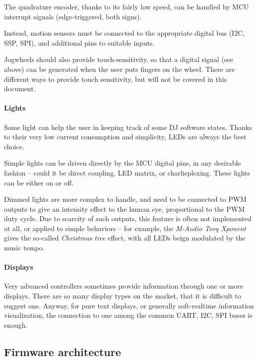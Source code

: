 \documentclass[a4paper,10pt]{article}
\begin{document}
\begin{multicols}{2}
The quadrature encoder, thanks to its fairly low speed, can be handled by
MCU interrupt signals (edge-triggered, both signs).

Instead, motion sensors must be connected to the appropriate digital bus
(I2C, SSP, SPI), and additional pins to suitable inputs.

Jogwheels should also provide touch-sensitivity, so that a digital signal
(see above) can be generated when the user puts fingers on the wheel.
There are different ways to provide touch sensitivity, but will not be
covered in this document.


\paragraph{Lights}
Some light can help the user in keeping track of some DJ software states.
Thanks to their very low current consumption and simplicity, LEDs are
always the best choice.

Simple lights can be driven directly by the MCU digital pins, in
any desirable fashion -- could it be direct coupling, LED matrix,
or charlieplexing. These lights can be either on or off.

Dimmed lights are more complex to handle, and need to be connected to PWM
outputs to give an intensity effect to the human eye, proportional to the
PWM duty cycle. Due to scarcity of such outputs, this feature is often not
implemented at all, or applied to simple behaviors -- for example, the
\emph{M-Audio Torq Xponent} \cite{maudio_xponent} gives the so-called
\emph{Christmas tree} effect, with all LEDs beign modulated by the music tempo.


\paragraph{Displays}
Very advanced controllers sometimes provide information through one or more
displays. There are so many display types on the market, that it is difficult
to suggest one. Anyway, for pure text displays, or generally soft-realtime
information visualization, the connection to one among the common UART, I2C,
SPI buses is enough.

\TODO


\subsection{Firmware architecture}


\end{multicols}
\end{document}
